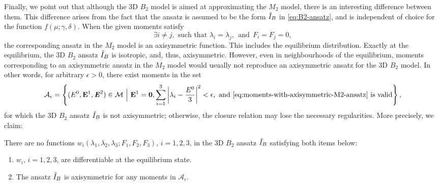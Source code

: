 Finally, we point out that although the 3D $B_2$ model is aimed at 
approximating the $M_2$ model, there is an interesting difference 
between them. This difference arises from the fact that
the ansatz is assumed to be the form $\hat I_B$ in \eqref{eq:B2-ansatz}, 
and is independent of choice for the function $f(\mu; \gamma, \delta)$. 
When the given moments satisfy
\begin{equation} \label{eq:moments-with-axisymmetric-M2-ansatz}
  \exists i\not=j, \text{ such that } \lambda_i = \lambda_j,
  ~~\text{and}~~F_i = F_j = 0,
\end{equation}
the corresponding ansatz in the $M_2$ model is an axisymmetric
function. This includes the equilibrium distribution. Exactly at the
equilibrium, the 3D $B_2$ ansatz $\hat I_B$ is isotropic, and, thus,
axisymmetric. However, even in neighbourhoods of the
equilibrium, moments corresponding to an axisymmetric ansatz in the
$M_2$ model would usually not reproduce an axisymmetric ansatz for the 3D
$B_2$ model. In other words, for arbitrary $\epsilon > 0$, there exist 
moments in the set
\[
\mathcal{A}_\epsilon = \left\{ (E^0,\mathbf{E}^1,\boldsymbol{\mathit{E}}^2) \in {\mathcal M} ~\Big|~
  \mathbf{E}^1 = \boldsymbol{0}, \sum_{i=1}^3 \left| \lambda_i -
    \dfrac{E^0}{3} \right|^2 < \epsilon, \text{ and
    \eqref{eq:moments-with-axisymmetric-M2-ansatz} is valid} \right\},
\]
for which the 3D $B_2$ ansatz $\hat I_B$ is not axisymmetric; otherwise, 
the closure relation may lose the necessary regularities. More precisely, 
we claim:
\begin{theorem} 
  There are no functions
  $w_i(\lambda_1, \lambda_2, \lambda_3; F_1, F_2, F_3)$, $i=1,2,3$, in
  the 3D $B_2$ ansatz $\hat I_B$ satisfying both items below:
  \begin{enumerate}
  \item $w_i$, $i=1,2,3$, are differentiable at the equilibrium state.
  \item The ansatz $\hat I_B$ is axisymmetric for any moments in
    $\mathcal{A}_\epsilon$.
  \end{enumerate}
\end{theorem}
